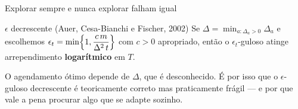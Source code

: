 \documentclass[aspectratio=169, 10pt]{beamer}
\newcommand{\gap}{\Delta}
\newcommand{\Reg}{L}
\begin{document}
\begin{frame}{Explorar sempre e nunca explorar falham igual}
  \centering

  \vspace{0.9em}
  \begin{teobox}{$\epsilon$ decrescente (Auer, Cesa-Bianchi e Fischer, 2002)}
    Se $\gap = \min_{a : \gap_a > 0} \gap_a$ e escolhemos
    $\displaystyle \epsilon_t = \min\Bigl\{1, \frac{c\,m}{\gap^2\,t}\Bigr\}$
    com $c > 0$ apropriado, então o $\epsilon_t$-guloso atinge
    arrependimento \textbf{logarítmico} em $T$.
  \end{teobox}

  \begin{alertabox}
    O agendamento ótimo depende de $\gap$, que é desconhecido. É por isso
    que o $\epsilon$-guloso decrescente é teoricamente correto mas
    praticamente frágil --- e por que vale a pena procurar algo que se
    adapte sozinho.
  \end{alertabox}
\end{frame}
\end{document}
